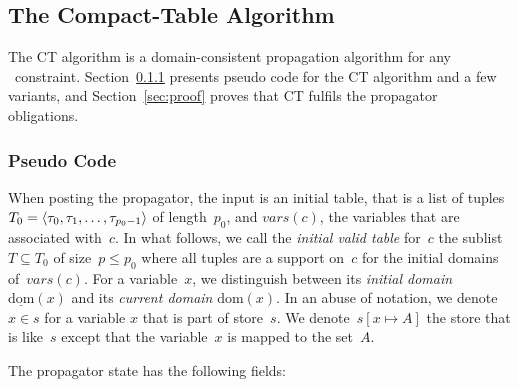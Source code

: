 \documentclass[a4paper,11pt]{article}
\newcommand{\Secref}[1]{Section~\ref{#1}}
\newcommand{\Table}{\Constraint{Table}}
\newcommand{\Dom}[1]{\text{dom}({#1})}
\newcommand{\Dominit}[1]{\underline{\text{dom}}(#1)}
\numberwithin{equation}{section}
\begin{document}
\subsection{The Compact-Table Algorithm}
\label{sec:ct}
The CT algorithm is a domain-consistent propagation
algorithm for any \Table~constraint. \Secref{ct:pseudo}
presents pseudo code for the CT algorithm and a few variants,
and \Secref{sec:proof} proves that CT fulfils the propagator
obligations.

\subsubsection{Pseudo Code}
\label{ct:pseudo}

When posting the propagator, the input is an initial table, that is
a list of tuples $T_0 = \left\langle\tau_0, \tau_1, \ldots, \tau_{p_0-1}\right\rangle$ of
length~$p_0$, and $\mathit{vars}(c)$, the variables that are associated with~$c$.
In what follows, we call the \emph{initial valid table}
for~$c$ the sublist~$T \subseteq T_0$ of size~$p \leq p_0$ where all
tuples are a support on~$c$ for the initial domains of~$\mathit{vars}(c)$.
For a variable~$x$, we distinguish between its \emph{initial domain}
~$\Dominit{x}$ and its \emph{current domain} $\Dom{x}$.
In an abuse of notation, we denote~$x \in s$ for a variable
$x$ that is part of store~$s$. We denote~$s[x \mapsto A]$
the store that is like~$s$ except that the variable~$x$ is mapped
to the set~$A$.

The propagator state has the following fields:
\end{document}

